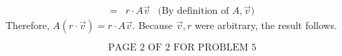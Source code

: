 \documentclass[12pt]{article}
\newenvironment{problem}[2][Problem]
{
	\begin{trivlist} 
		\item[\hskip \labelsep {\bfseries #1 #2:}]
	}
{
	\end{trivlist}
	}
\newenvironment{solution}[1][Solution]
{
	\begin{trivlist} 
		\item[\hskip \labelsep {\itshape #1:}]
	}
	{
	\end{trivlist}
}
\begin{document}
\begin{problem}{6}
\begin{solution}
\begin{align*}
=& r\cdot A \vec{v} &\text{(By definition of $A, \vec{v}$)}
\end{align*}
Therefore, $A(r\cdot\vec{v})=r\cdot A\vec{v}$. Because $\vec{v}, r$ were arbitrary, the result follows.
\end{solution}
\noindent
\newline
\newline
\newline
\newline
\newline
\newline
\newline
\newline
\newline
\newline
\newline
\newline
\newline
\newline
\newline
\newline
\newline
\newline
\newline
\newline
\newline
\newline
\[
\text{PAGE 2 OF 2 FOR PROBLEM 5}
\]







\end{problem}
\end{document}
